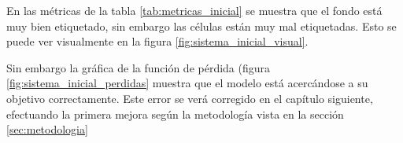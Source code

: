 
En las métricas de la tabla \ref{tab:metricas_inicial} se muestra que el fondo está muy bien etiquetado, sin embargo las células están muy mal etiquetadas. Esto se puede ver visualmente en la figura \ref{fig:sistema_inicial_visual}. 

Sin embargo la gráfica de la función de pérdida (figura \ref{fig:sistema_inicial_perdidas} muestra que el modelo está acercándose a su objetivo correctamente. Este error se verá corregido en el capítulo siguiente, efectuando la primera mejora según la metodología vista en la sección \ref{sec:metodologia} 